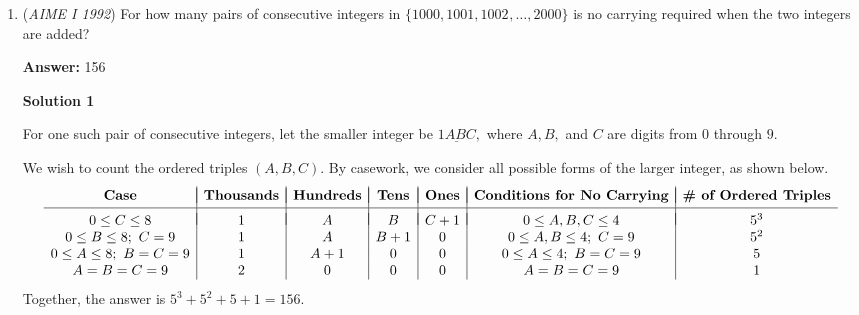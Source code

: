 \begin{enumerate}
\textbf{Solution}

We consider the method in which repeating decimals are normally converted to fractions with an example:

 $x=0.\overline{176}$
$\Rightarrow 1000x=176.\overline{176}$
$\Rightarrow 999x=1000x-x=176$
$\Rightarrow x=\frac{176}{999}$

 Thus, let $x=0.\overline{abc}$
$\Rightarrow 1000x=abc.\overline{abc}$
$\Rightarrow 999x=1000x-x=abc$
$\Rightarrow x=\frac{abc}{999}$

 If $abc$ is not divisible by $3$ or $37$, then this is in lowest terms. Let us consider the other multiples: $333$ multiples of $3$, $27$ of $37$, and $9$ of both $3$ and $37$, so $999-333-27+9 = 648$, which is the amount that are neither. The $12$ numbers that are multiples of $81$ reduce to multiples of $3$. We have to count these since it will reduce to a multiple of $3$ which we have removed from $999$, but, this cannot be removed since the numerator cannot cancel the $3$.There aren't any numbers which are multiples of $37^2$, so we can't get numerators which are multiples of $37$. Therefore $648 + 12 = \boxed{660}$.

 Note: You can use Euler's totient function to find the numbers relatively prime to 999 which gives 648. 

 


	\item (\textit{AIME I 1992}) For how many pairs of consecutive integers in $\{1000,1001,1002^{}_{},\ldots,2000\}$ is no carrying required when the two integers are added?


 
 \textbf{Answer: }156



\textbf{Solution 1}

For one such pair of consecutive integers, let the smaller integer be $\underline{1ABC},$ where $A,B,$ and $C$ are digits from $0$ through $9.$

 We wish to count the ordered triples $(A,B,C).$ By casework, we consider all possible forms of the larger integer, as shown below.
 \[\begin{array}{c|c|c|c|c|c|c} & & & & & & \\ [-2.5ex] \textbf{Case} & \textbf{Thousands} & \textbf{Hundreds} & \textbf{Tens} & \textbf{Ones} & \textbf{Conditions for No Carrying} & \boldsymbol{\#}\textbf{ of Ordered Triples} \\ [0.5ex] \hline & & & & & & \\ [-2ex] 0\leq C\leq 8 & 1 & A & B & C+1 & 0\leq A,B,C\leq 4 & 5^3 \\ 0\leq B\leq 8; \ C=9 & 1 & A & B+1 & 0 & 0\leq A,B\leq 4; \ C=9 & 5^2 \\ 0\leq A\leq 8; \ B=C=9 & 1 & A+1 & 0 & 0 & 0\leq A\leq 4; \ B=C=9 & 5 \\ A=B=C=9 & 2 & 0 & 0 & 0 & A=B=C=9 & 1 \end{array}\]Together, the answer is $5^3+5^2+5+1=\boxed{156}.$





\end{enumerate}
